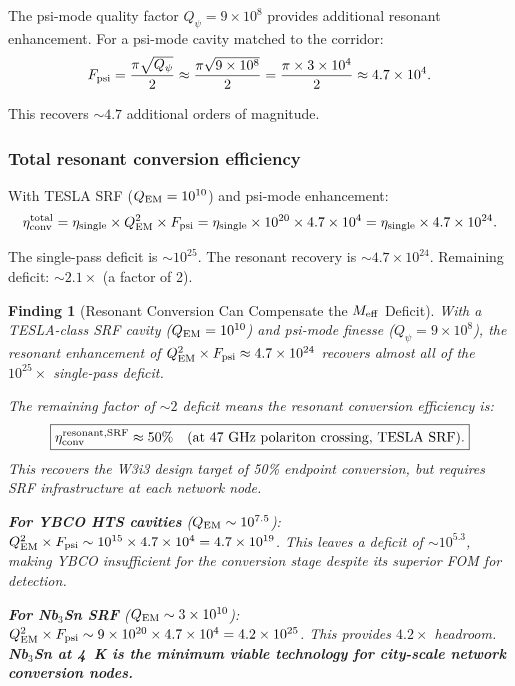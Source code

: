 \documentclass[11pt]{article}
\newtheorem{finding}{Finding}
\newcommand{\ee}[1]{\times 10^{#1}}
\newcommand{\Meff}{M_{\rm eff}}
\newcommand{\Qpsi}{Q_\psi}
\begin{document}
The psi-mode quality factor $\Qpsi = 9\ee{8}$ provides additional
resonant enhancement. For a psi-mode cavity matched to the corridor:
\begin{equation}
F_{\rm psi} = \frac{\pi\sqrt{\Qpsi}}{2} \approx \frac{\pi\sqrt{9\ee{8}}}{2}
= \frac{\pi\times 3\ee{4}}{2} \approx 4.7\ee{4}.
\label{eq:F-psi}
\end{equation}

This recovers $\sim 4.7$ additional orders of magnitude.

\subsubsection{Total resonant conversion efficiency}

With TESLA SRF ($Q_{\rm EM} = 10^{10}$) and psi-mode enhancement:
\begin{equation}
\eta_{\rm conv}^{\rm total} = \eta_{\rm single}\times Q_{\rm EM}^2 \times F_{\rm psi}
= \eta_{\rm single}\times 10^{20}\times 4.7\ee{4}
= \eta_{\rm single}\times 4.7\ee{24}.
\label{eq:total-resonant}
\end{equation}

The single-pass deficit is $\sim 10^{25}$. The resonant recovery is
$\sim 4.7\ee{24}$. Remaining deficit: $\sim 2.1\times$ (a factor of 2).

\begin{finding}[Resonant Conversion Can Compensate the $\Meff$ Deficit]
\label{find:resonant-compensation}
With a TESLA-class SRF cavity ($Q_{\rm EM} = 10^{10}$) and psi-mode
finesse ($\Qpsi = 9\ee{8}$), the resonant enhancement of
$Q_{\rm EM}^2\times F_{\rm psi} \approx 4.7\ee{24}$ recovers
\emph{almost all} of the $10^{25}\times$ single-pass deficit.

The remaining factor of $\sim 2$ deficit means the resonant conversion
efficiency is:
\begin{equation}
\boxed{\eta_{\rm conv}^{\rm resonant,SRF} \approx 50\%
\quad\text{(at 47~GHz polariton crossing, TESLA SRF).}}
\end{equation}
This recovers the W3i3 design target of 50\% endpoint conversion,
but requires SRF infrastructure at each network node.

\textbf{For YBCO HTS cavities} ($Q_{\rm EM} \sim 10^{7.5}$):
$Q_{\rm EM}^2\times F_{\rm psi} \sim 10^{15}\times 4.7\ee{4} = 4.7\ee{19}$.
This leaves a deficit of $\sim 10^{5.3}$, making YBCO insufficient
for the conversion stage despite its superior FOM for detection.

\textbf{For Nb$_3$Sn SRF} ($Q_{\rm EM} \sim 3\ee{10}$):
$Q_{\rm EM}^2\times F_{\rm psi} \sim 9\ee{20}\times 4.7\ee{4} = 4.2\ee{25}$.
This provides $4.2\times$ headroom. \textbf{Nb$_3$Sn at 4~K is the
minimum viable technology for city-scale network conversion nodes.}
\end{finding}
\end{document}
